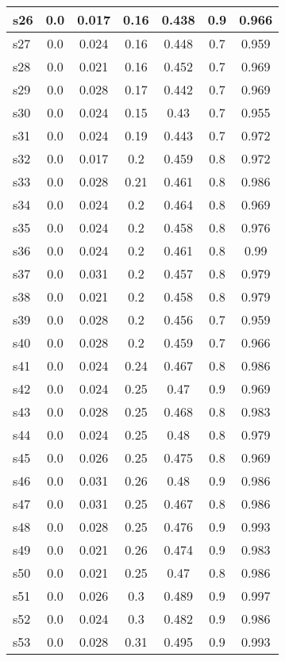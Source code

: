 \documentclass{article}
\begin{document}
\begin{tabular}{|l|c|c|c|c|c|c|}
s26 &0.0 & 0.017 & 0.16 & 0.438 & 0.9 & 0.966\\
\hline
s27 &0.0 & 0.024 & 0.16 & 0.448 & 0.7 & 0.959\\
\hline
s28 &0.0 & 0.021 & 0.16 & 0.452 & 0.7 & 0.969\\
\hline
s29 &0.0 & 0.028 & 0.17 & 0.442 & 0.7 & 0.969\\
\hline
s30 &0.0 & 0.024 & 0.15 & 0.43 & 0.7 & 0.955\\
\hline
s31 &0.0 & 0.024 & 0.19 & 0.443 & 0.7 & 0.972\\
\hline
s32 &0.0 & 0.017 & 0.2 & 0.459 & 0.8 & 0.972\\
\hline
s33 &0.0 & 0.028 & 0.21 & 0.461 & 0.8 & 0.986\\
\hline
s34 &0.0 & 0.024 & 0.2 & 0.464 & 0.8 & 0.969\\
\hline
s35 &0.0 & 0.024 & 0.2 & 0.458 & 0.8 & 0.976\\
\hline
s36 &0.0 & 0.024 & 0.2 & 0.461 & 0.8 & 0.99\\
\hline
s37 &0.0 & 0.031 & 0.2 & 0.457 & 0.8 & 0.979\\
\hline
s38 &0.0 & 0.021 & 0.2 & 0.458 & 0.8 & 0.979\\
\hline
s39 &0.0 & 0.028 & 0.2 & 0.456 & 0.7 & 0.959\\
\hline
s40 &0.0 & 0.028 & 0.2 & 0.459 & 0.7 & 0.966\\
\hline
s41 &0.0 & 0.024 & 0.24 & 0.467 & 0.8 & 0.986\\
\hline
s42 &0.0 & 0.024 & 0.25 & 0.47 & 0.9 & 0.969\\
\hline
s43 &0.0 & 0.028 & 0.25 & 0.468 & 0.8 & 0.983\\
\hline
s44 &0.0 & 0.024 & 0.25 & 0.48 & 0.8 & 0.979\\
\hline
s45 &0.0 & 0.026 & 0.25 & 0.475 & 0.8 & 0.969\\
\hline
s46 &0.0 & 0.031 & 0.26 & 0.48 & 0.9 & 0.986\\
\hline
s47 &0.0 & 0.031 & 0.25 & 0.467 & 0.8 & 0.986\\
\hline
s48 &0.0 & 0.028 & 0.25 & 0.476 & 0.9 & 0.993\\
\hline
s49 &0.0 & 0.021 & 0.26 & 0.474 & 0.9 & 0.983\\
\hline
s50 &0.0 & 0.021 & 0.25 & 0.47 & 0.8 & 0.986\\
\hline
s51 &0.0 & 0.026 & 0.3 & 0.489 & 0.9 & 0.997\\
\hline
s52 &0.0 & 0.024 & 0.3 & 0.482 & 0.9 & 0.986\\
\hline
s53 &0.0 & 0.028 & 0.31 & 0.495 & 0.9 & 0.993\\

\end{tabular}
\end{document}
